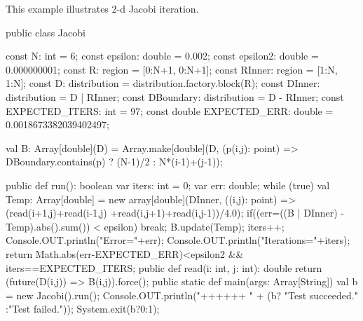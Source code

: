 
This example illustrates 2-d Jacobi iteration.

\begin{xten}
public class Jacobi {
   const N: int = 6;
   const epsilon: double = 0.002;
   const epsilon2: double = 0.000000001;
   const R: region = [0:N+1, 0:N+1];
   const RInner: region = [1:N, 1:N];
   const D: distribution = distribution.factory.block(R);
   const DInner: distribution = D | RInner;
   const DBoundary: distribution = D - RInner;
   const EXPECTED_ITERS: int  = 97;
   const double EXPECTED_ERR: double = 0.0018673382039402497;
     
   val B: Array[double](D) = Array.make[double](D,
        (p(i,j): point) => DBoundary.contains(p) ? (N-1)/2 : N*(i-1)+(j-1));
    
   public def run(): boolean {
      var iters: int = 0;
      var err: double;
      while (true) {
        val Temp: Array[double] = 
           new array[double](DInner, ((i,j): point) =>
             (read(i+1,j)+read(i-1,j) +read(i,j+1)+read(i,j-1))/4.0);
        if((err=((B | DInner) - Temp).abs().sum()) < epsilon)
           break; 
        B.update(Temp);
        iters++; 
      }
      Console.OUT.println("Error="+err);
      Console.OUT.println("Iterations="+iters);
      return Math.abs(err-EXPECTED_ERR)<epsilon2 
          && iters==EXPECTED_ITERS;
   }
   public def read(i: int, j: int): double {
      return (future(D(i,j)) => B(i,j)).force();
   }
   public static def main(args: Array[String]) {
      val b = new Jacobi().run();
      Console.OUT.println("++++++ "
                          + (b? "Test succeeded."
                             :"Test failed."));
      System.exit(b?0:1);
   }
}
\end{xten}
